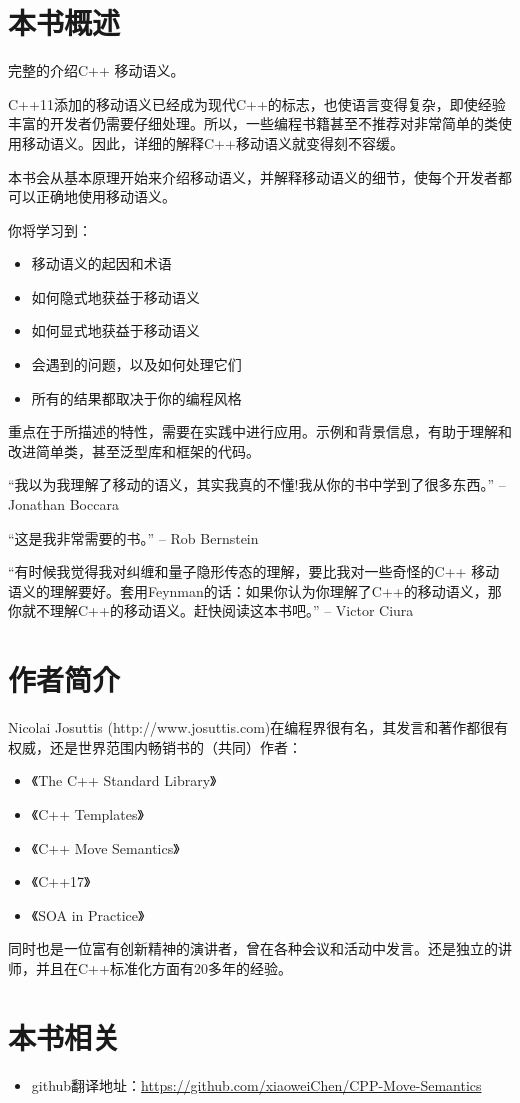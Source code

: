 
\section*{本书概述}

完整的介绍C++ 移动语义。

C++11添加的移动语义已经成为现代C++的标志，也使语言变得复杂，即使经验丰富的开发者仍需要仔细处理。所以，一些编程书籍甚至不推荐对非常简单的类使用移动语义。因此，详细的解释C++移动语义就变得刻不容缓。

本书会从基本原理开始来介绍移动语义，并解释移动语义的细节，使每个开发者都可以正确地使用移动语义。

你将学习到：

\begin{itemize}
    \item 移动语义的起因和术语
    \item 如何隐式地获益于移动语义
    \item 如何显式地获益于移动语义
    \item 会遇到的问题，以及如何处理它们
    \item 所有的结果都取决于你的编程风格
\end{itemize}

重点在于所描述的特性，需要在实践中进行应用。示例和背景信息，有助于理解和改进简单类，甚至泛型库和框架的代码。

“我以为我理解了移动的语义，其实我真的不懂!我从你的书中学到了很多东西。”	-- Jonathan Boccara

“这是我非常需要的书。” -- Rob Bernstein

“有时候我觉得我对纠缠和量子隐形传态的理解，要比我对一些奇怪的C++ 移动语义的理解要好。套用Feynman的话：如果你认为你理解了C++的移动语义，那你就不理解C++的移动语义。赶快阅读这本书吧。”	-- Victor Ciura


\section*{作者简介}
Nicolai Josuttis (http://www.josuttis.com)在编程界很有名，其发言和著作都很有权威，还是世界范围内畅销书的（共同）作者：

\begin{itemize}
    \item 《The C++ Standard Library》
    \item 《C++ Templates》
    \item 《C++ Move Semantics》
    \item 《C++17》
    \item 《SOA in Practice》
\end{itemize}

同时也是一位富有创新精神的演讲者，曾在各种会议和活动中发言。还是独立的讲师，并且在C++标准化方面有20多年的经验。

\section*{本书相关}
\begin{itemize}
    \item github翻译地址：\href{https://github.com/xiaoweiChen/CPP-Move-Semantics}{https://github.com/xiaoweiChen/CPP-Move-Semantics}
\end{itemize}